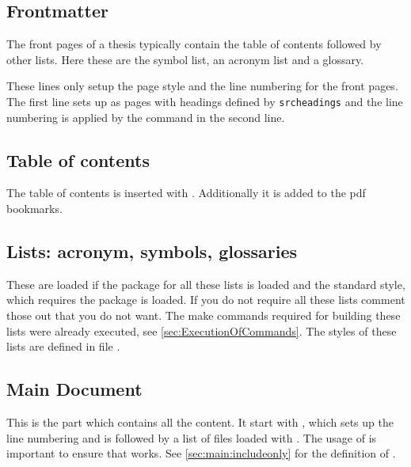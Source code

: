 \subsection{Frontmatter}
The front pages of a thesis typically contain the table of contents followed by other lists. Here these are the symbol list, an acronym list and a glossary.

These lines only setup the page style and the line numbering for the front pages. The first line sets up as pages with headings defined by \texttt{srcheadings} and the line numbering is applied by the command  in the second line.

\subsection{Table of contents}
The table of contents is inserted with . Additionally it is added to the pdf bookmarks.

\subsection{Lists: acronym, symbols, glossaries}
These are loaded if the package for all these lists is loaded and the standard 
style, which requires the  package is loaded. If you do 
not require all these lists comment those out that you do not want. The make 
commands required for building these lists were already executed, see 
\vref{sec:ExecutionOfCommands}. The styles of these lists are defined in file 
.

\subsection{Main Document}
This is the part which contains all the content. It start with , which sets up the line numbering and is followed by a list of files loaded with . The usage of  is important to ensure that  works. See \cref{sec:main:includeonly} for the definition of .

